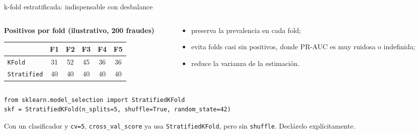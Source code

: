 \documentclass[aspectratio=169,12pt]{beamer}
\newcommand{\colhead}[1]{\textbf{#1}\par\vspace{2pt}}
\newcommand{\hrow}{\rowcolor{mlcream}}
\begin{document}
\begin{frame}[fragile]{k-fold estratificada: indispensable con desbalance}
  \begin{columns}[T]
    \begin{column}{0.44\textwidth}
      \colhead{Positivos por fold (ilustrativo, 200 fraudes)}
      \centering\small
      \begin{tabular}{@{}lccccc@{}}
        \toprule
        \hrow & F1 & F2 & F3 & F4 & F5 \\
        \midrule
        \texttt{KFold} & 31 & 52 & 45 & 36 & 36 \\
        \texttt{Stratified} & 40 & 40 & 40 & 40 & 40 \\
        \bottomrule
      \end{tabular}
    \end{column}
    \begin{column}{0.5\textwidth}
      \small
      \begin{itemize}
        \item preserva la prevalencia en cada fold;
        \item evita folds casi sin positivos, donde PR-AUC es muy ruidosa o indefinida;
        \item reduce la varianza de la estimación.
      \end{itemize}
    \end{column}
  \end{columns}
\begin{lstlisting}[basicstyle=\ttfamily\scriptsize,columns=fullflexible,keepspaces=true]
from sklearn.model_selection import StratifiedKFold
skf = StratifiedKFold(n_splits=5, shuffle=True, random_state=42)
\end{lstlisting}
  \begin{rulebox}
    \small Con un clasificador y \texttt{cv=5}, \texttt{cross\_val\_score} ya usa \texttt{StratifiedKFold}, pero sin \texttt{shuffle}. Declárelo explícitamente.
  \end{rulebox}
\end{frame}
\end{document}
